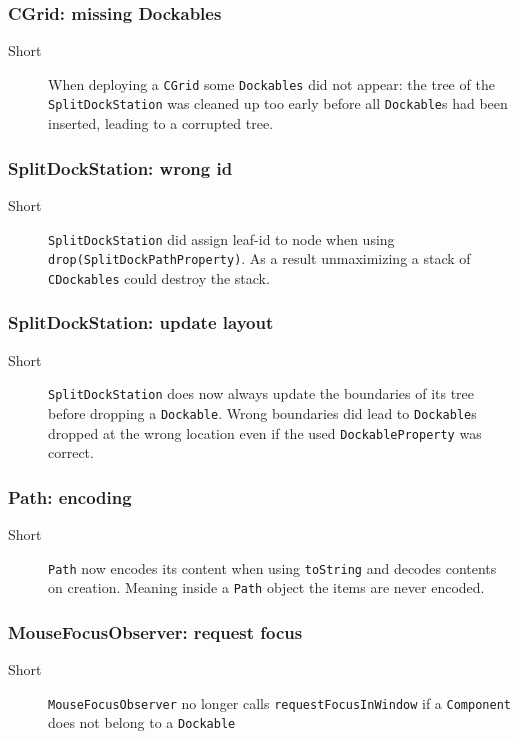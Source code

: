 \documentclass[a4paper,10pt]{article}
\newcommand{\src}[1]{\lstinline[basicstyle=\normalsize\ttfamily,keywordstyle=\normalsize\ttfamily,identifierstyle=\normalsize\ttfamily]|#1|}
\newcommand{\short}{\item[Short]}
\begin{document}
\subsubsection{CGrid: missing Dockables}
\begin{description}
 \short When deploying a \src{CGrid} some \src{Dockables} did not appear: the tree of the \src{SplitDockStation} was cleaned up too early before all \src{Dockable}s had been inserted, leading to a corrupted tree.
\end{description}

\subsubsection{SplitDockStation: wrong id}
\begin{description}
 \short \src{SplitDockStation} did assign leaf-id to node when using \linebreak \src{drop(SplitDockPathProperty)}. As a result unmaximizing a stack of \src{CDockables} could destroy the stack.
\end{description}

\subsubsection{SplitDockStation: update layout}
\begin{description}
 \short \src{SplitDockStation} does now always update the boundaries of its tree before dropping a \src{Dockable}. Wrong boundaries did lead to \src{Dockable}s dropped at the wrong location even if the used \src{DockableProperty} was correct.
\end{description}

\subsubsection{Path: encoding}
\begin{description}
 \short \src{Path} now encodes its content when using \src{toString} and decodes contents on creation. Meaning inside a \src{Path} object the items are never encoded.
\end{description}

\subsubsection{MouseFocusObserver: request focus}
\begin{description}
 \short \src{MouseFocusObserver} no longer calls \src{requestFocusInWindow} if a \linebreak \src{Component} does not belong to a \src{Dockable}
\end{description}
\end{document}

